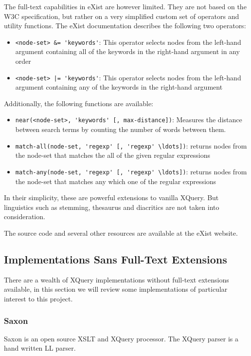 The full-text capabilities in eXist are however limited. They are not based on
the W3C specification, but rather on a very simplified custom set of operators
and utility functions. The eXist documentation\cite{exist_doc} describes the
following two operators:

\begin{itemize}
  \item \verb!<node-set> &= 'keywords'!: This operator selects nodes from the
  left-hand argument containing all of the keywords in the right-hand argument 
  in any order
  \item \verb!<node-set> |= 'keywords'!: This operator selects nodes from the
  left-hand argument containing any of the keywords in the right-hand argument
\end{itemize}

Additionally, the following functions are available:
\begin{itemize}
  \item \verb!near(<node-set>, 'keywords' [, max-distance])!: Measures the 
  distance between search terms by counting the number of words between 
  them.
  \item \verb!match-all(node-set, 'regexp' [, 'regexp' \ldots])!: returns
  nodes from the node-set that matches the all of the given regular expressions 
  \item \verb!match-any(node-set, 'regexp' [, 'regexp' \ldots])!: returns nodes
  from the node-set that matches any which one of the regular expressions
\end{itemize}

In their simplicity, these are powerful extensions to vanilla XQuery. But
linguistics such as stemming, thesaurus and diacritics are not taken into
consideration.

The source code and several other resources are available at the eXist
website\cite{existweb}. 

\subsection{Implementations Sans Full-Text Extensions}
There are a wealth of XQuery implementations without full-text
extensions available, in this section we will review some implementations of
particular interest to this project.

\subsubsection{Saxon}
Saxon is an open source XSLT and XQuery processor. The XQuery parser is a hand
written LL parser.

